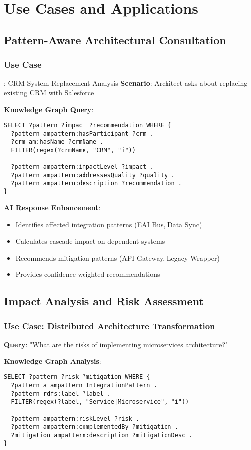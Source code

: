 \documentclass[12pt,a4paper]{article}
\begin{document}
\section{Use Cases and Applications}

\subsection{Pattern-Aware Architectural Consultation}

\subsubsection{Use Case}: CRM System Replacement Analysis
\textbf{Scenario}: Architect asks about replacing existing CRM with Salesforce

\textbf{Knowledge Graph Query}:
\begin{lstlisting}[style=sparql]
SELECT ?pattern ?impact ?recommendation WHERE {
  ?pattern ampattern:hasParticipant ?crm .
  ?crm am:hasName ?crmName .
  FILTER(regex(?crmName, "CRM", "i"))

  ?pattern ampattern:impactLevel ?impact .
  ?pattern ampattern:addressesQuality ?quality .
  ?pattern ampattern:description ?recommendation .
}
\end{lstlisting}

\textbf{AI Response Enhancement}:
\begin{itemize}
    \item Identifies affected integration patterns (EAI Bus, Data Sync)
    \item Calculates cascade impact on dependent systems
    \item Recommends mitigation patterns (API Gateway, Legacy Wrapper)
    \item Provides confidence-weighted recommendations
\end{itemize}

\subsection{Impact Analysis and Risk Assessment}

\subsubsection{Use Case: Distributed Architecture Transformation}
\textbf{Query}: "What are the risks of implementing microservices architecture?"

\textbf{Knowledge Graph Analysis}:
\begin{lstlisting}[style=sparql]
SELECT ?pattern ?risk ?mitigation WHERE {
  ?pattern a ampattern:IntegrationPattern .
  ?pattern rdfs:label ?label .
  FILTER(regex(?label, "Service|Microservice", "i"))

  ?pattern ampattern:riskLevel ?risk .
  ?pattern ampattern:complementedBy ?mitigation .
  ?mitigation ampattern:description ?mitigationDesc .
}
\end{lstlisting}
\end{document}
